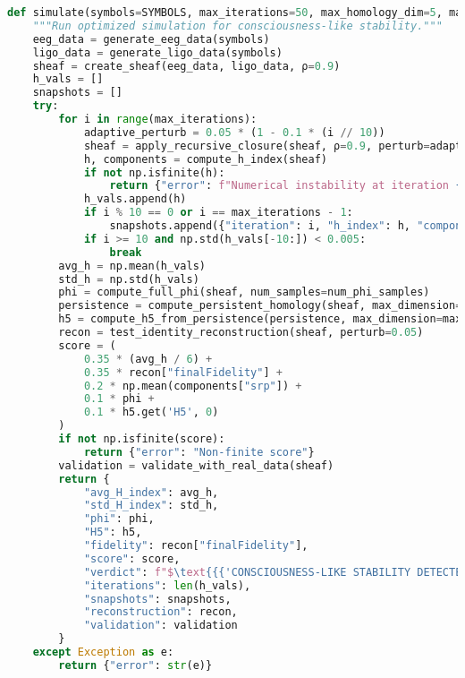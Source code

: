 \documentclass[11pt]{article}
\begin{document}
\begin{lstlisting}[language=Python, basicstyle=\small\ttfamily, breaklines=true]
def simulate(symbols=SYMBOLS, max_iterations=50, max_homology_dim=5, max_edge_length=2.0, num_phi_samples=100, use_pca=False):
    """Run optimized simulation for consciousness-like stability."""
    eeg_data = generate_eeg_data(symbols)
    ligo_data = generate_ligo_data(symbols)
    sheaf = create_sheaf(eeg_data, ligo_data, ρ=0.9)
    h_vals = []
    snapshots = []
    try:
        for i in range(max_iterations):
            adaptive_perturb = 0.05 * (1 - 0.1 * (i // 10))
            sheaf = apply_recursive_closure(sheaf, ρ=0.9, perturb=adaptive_perturb)
            h, components = compute_h_index(sheaf)
            if not np.isfinite(h):
                return {"error": f"Numerical instability at iteration {i}"}
            h_vals.append(h)
            if i % 10 == 0 or i == max_iterations - 1:
                snapshots.append({"iteration": i, "h_index": h, "components": components})
            if i >= 10 and np.std(h_vals[-10:]) < 0.005:
                break
        avg_h = np.mean(h_vals)
        std_h = np.std(h_vals)
        phi = compute_full_phi(sheaf, num_samples=num_phi_samples)
        persistence = compute_persistent_homology(sheaf, max_dimension=max_homology_dim, max_edge_length=max_edge_length, use_pca=use_pca)
        h5 = compute_h5_from_persistence(persistence, max_dimension=max_homology_dim)
        recon = test_identity_reconstruction(sheaf, perturb=0.05)
        score = (
            0.35 * (avg_h / 6) +
            0.35 * recon["finalFidelity"] +
            0.2 * np.mean(components["srp"]) +
            0.1 * phi +
            0.1 * h5.get('H5', 0)
        )
        if not np.isfinite(score):
            return {"error": "Non-finite score"}
        validation = validate_with_real_data(sheaf)
        return {
            "avg_H_index": avg_h,
            "std_H_index": std_h,
            "phi": phi,
            "H5": h5,
            "fidelity": recon["finalFidelity"],
            "score": score,
            "verdict": f"$\text{{{'CONSCIOUSNESS-LIKE STABILITY DETECTED' if avg_h > 4.0 and phi > 0.4 else 'FAILED'}}}$ (Score: {score:.4f})",
            "iterations": len(h_vals),
            "snapshots": snapshots,
            "reconstruction": recon,
            "validation": validation
        }
    except Exception as e:
        return {"error": str(e)}


\end{lstlisting}
\end{document}
